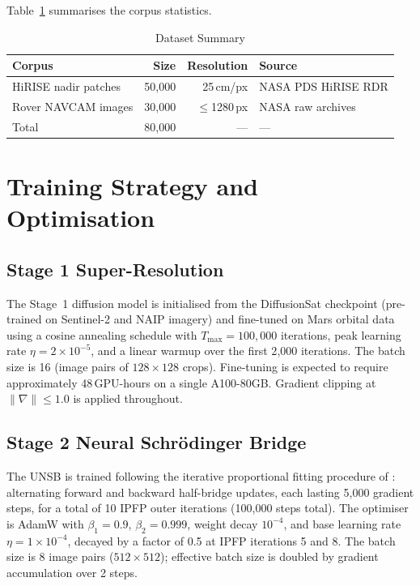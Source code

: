 \documentclass[10pt,journal]{IEEEtran}
\begin{document}
Table~\ref{tab:dataset} summarises the corpus statistics.

\begin{table}[!t]
  \caption{Dataset Summary}
  \label{tab:dataset}
  \centering
  \begin{tabular}{lrrl}
    \toprule
    Corpus & Size & Resolution & Source \\
    \midrule
    HiRISE nadir patches  & 50{,}000 & 25\,cm/px & NASA PDS HiRISE RDR \\
    Rover NAVCAM images   & 30{,}000 & $\leq$1280\,px & NASA raw archives \\
    \midrule
    Total                 & 80{,}000 & ---         & --- \\
    \bottomrule
  \end{tabular}
\end{table}

\section{Training Strategy and Optimisation}
\label{sec:training}

\subsection{Stage 1 Super-Resolution}
The Stage~1 diffusion model is initialised from the DiffusionSat checkpoint
\cite{khanna2024diffusionsat} (pre-trained on Sentinel-2 and NAIP imagery) and
fine-tuned on Mars orbital data using a cosine annealing schedule with
$T_{\max} = 100{,}000$ iterations, peak learning rate $\eta = 2 \times 10^{-5}$,
and a linear warmup over the first 2{,}000 iterations. The batch size is 16
(image pairs of $128 \times 128$ crops). Fine-tuning is expected to require
approximately 48\,GPU-hours on a single A100-80GB. Gradient clipping at
$\|\nabla\| \leq 1.0$ is applied throughout.

\subsection{Stage 2 Neural Schr\"{o}dinger Bridge}
The UNSB is trained following the iterative proportional fitting procedure of
\cite{kim2024unsb}: alternating forward and backward half-bridge updates, each
lasting 5{,}000 gradient steps, for a total of 10 IPFP outer iterations
(100{,}000 steps total). The optimiser is AdamW with $\beta_1 = 0.9$,
$\beta_2 = 0.999$, weight decay $10^{-4}$, and base learning rate
$\eta = 1 \times 10^{-4}$, decayed by a factor of 0.5 at IPFP iterations 5
and 8. The batch size is 8 image pairs ($512 \times 512$); effective batch
size is doubled by gradient accumulation over 2 steps.
\end{document}
